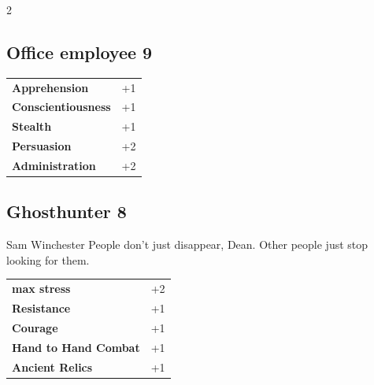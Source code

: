 \begin{multicols}{2}
\begin{tcolorbox}

\end{tcolorbox}

\begin{tcolorbox}
    \subsection*{Office employee \hfill \small{9 }}
    \tcblower




\begin{tabular}{@{}ll@{}}
    \textbf{Apprehension} & +1\\
    \textbf{Conscientiousness} & +1\\
    \textbf{Stealth} & +1\\
    \textbf{Persuasion} & +2\\
    \textbf{Administration} & +2\\
\end{tabular}


\end{tcolorbox}

\begin{tcolorbox}
    \subsection*{Ghosthunter \hfill \small{8 }}
    \tcblower


\begin{pquote}{Sam Winchester}
People don’t just disappear, Dean. Other people just stop looking for them.
\end{pquote}

\vspace{3mm}

\begin{tabular}{@{}ll@{}}
    \textbf{max stress} & +2\\
    \textbf{Resistance} & +1\\
    \textbf{Courage} & +1\\
    \textbf{Hand to Hand Combat} & +1\\
    \textbf{Ancient Relics} & +1\\
\end{tabular}


\end{tcolorbox}
\end{multicols}
